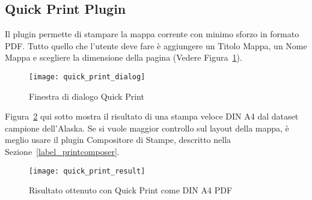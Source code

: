 
\subsection{Quick Print Plugin}


Il plugin  permette di stampare la mappa corrente con minimo sforzo in formato PDF. Tutto quello che l'utente deve fare è aggiungere un Titolo Mappa, un Nome Mappa e scegliere la dimensione della pagina (Vedere Figura~\ref{fig:quickprint}). 
\begin{figure}[ht]
   \begin{center}
   \caption{Finestra di dialogo Quick Print \nixcaption}\label{fig:quickprint}\smallskip
   \texttt{[image: quick\_print\_dialog]}
\end{center}
\end{figure}

Figura~\ref{fig:quickprint_result} qui sotto mostra il risultato di una stampa veloce DIN A4 dal dataset campione dell'Alaska. Se si vuole maggior controllo sul layout della mappa, è meglio usare il plugin Compositore di Stampe, descritto nella Sezione~\ref{label_printcomposer}.

\begin{figure}[ht]
   \begin{center}
   \caption{Risultato ottenuto con Quick Print come DIN A4 PDF\nixcaption}\label{fig:quickprint_result}\smallskip
   \texttt{[image: quick\_print\_result]}
\end{center}
\end{figure}


